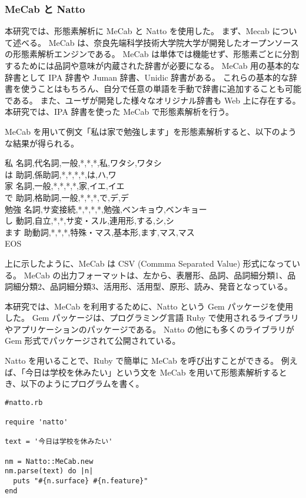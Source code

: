 \documentclass[11pt,a4j]{jsarticle}
\begin{document}
\subsubsection{MeCab と Natto}
本研究では、形態素解析に MeCab と Natto を使用した。
まず、Mecab について述べる。
MeCab  は、奈良先端科学技術大学院大学が開発したオープンソースの形態素解析エンジンである。
MeCab は単体では機能せず、形態素ごとに分割するためには品詞や意味が内蔵された辞書が必要になる。
MeCab 用の基本的な辞書として IPA 辞書や Juman 辞書、Unidic 辞書がある。
これらの基本的な辞書を使うことはもちろん、自分で任意の単語を手動で辞書に追加することも可能である。
また、ユーザが開発した様々なオリジナル辞書も Web 上に存在する。
本研究では、IPA 辞書を使った MeCab で形態素解析を行う。

MeCab を用いて例文「私は家で勉強します」を形態素解析すると、以下のような結果が得られる。

\begin{itembox}[l]
私  名詞,代名詞,一般,*,*,*,私,ワタシ,ワタシ\\
は  助詞,係助詞,*,*,*,*,は,ハ,ワ\\
家  名詞,一般,*,*,*,*,家,イエ,イエ\\
で  助詞,格助詞,一般,*,*,*,で,デ,デ\\
勉強  名詞,サ変接続,*,*,*,*,勉強,ベンキョウ,ベンキョー\\
し  動詞,自立,*,*,サ変・スル,連用形,する,シ,シ\\
ます  助動詞,*,*,*,特殊・マス,基本形,ます,マス,マス\\
EOS
\end{itembox}

上に示したように、MeCab は CSV (Commma Separated Value) 形式になっている。
MeCab の出力フォーマットは、左から、表層形、品詞、品詞細分類1、品詞細分類2、品詞細分類3、活用形、活用型、原形、読み、発音となっている。


本研究では、MeCab を利用するために、Natto という Gem パッケージを使用した。
Gem パッケージは、プログラミング言語 Ruby で使用されるライブラリやアプリケーションのパッケージである。
Natto の他にも多くのライブラリが Gem 形式でパッケージされて公開されている。

Natto を用いることで、Ruby で簡単に MeCab を呼び出すことができる。
例えば、「今日は学校を休みたい」という文を MeCab を用いて形態素解析するとき、以下のようにプログラムを書く。

\begin{verbatim}
#natto.rb

require 'natto'

text = '今日は学校を休みたい'

nm = Natto::MeCab.new
nm.parse(text) do |n|
  puts "#{n.surface} #{n.feature}"
end
\end{verbatim}
\end{document}
